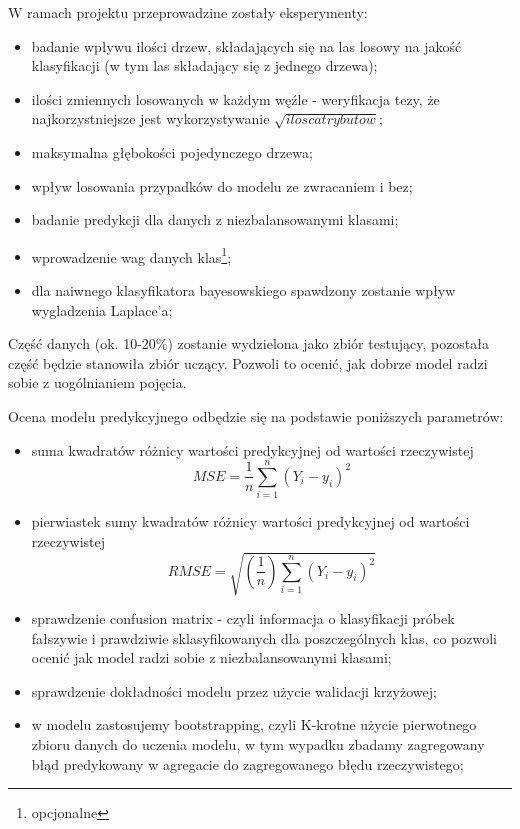 
W ramach projektu przeprowadzine zostały eksperymenty:
\begin{itemize}
    \item badanie wpływu ilości drzew, składających się na las losowy na jakość klasyfikacji (w tym las składający się z jednego drzewa);
    \item ilości zmiennych losowanych w każdym węźle - weryfikacja tezy, że najkorzystniejsze jest wykorzystywanie $\sqrt {ilosc atrybutow}$;
    \item maksymalna głębokości pojedynczego drzewa;
    \item wpływ losowania przypadków do modelu ze zwracaniem i bez;
    \item badanie predykcji dla danych z niezbalansowanymi klasami;
        \item wprowadzenie wag danych klas\footnote[2]{opcjonalne};
        \item dla naiwnego klasyfikatora bayesowskiego spawdzony zostanie wpływ wygladzenia Laplace'a;
        
\end{itemize}

Część danych (ok. 10-20\%) zostanie wydzielona jako zbiór testujący, pozostała część będzie stanowiła zbiór uczący. Pozwoli to ocenić, jak dobrze model radzi sobie z uogólnianiem pojęcia. 

Ocena modelu predykcyjnego odbędzie się na podstawie poniższych parametrów:
\begin{itemize}
    \item suma kwadratów różnicy wartości predykcyjnej od wartości rzeczywistej
    \begin{equation}
    MSE = {\frac{1}{n}\sum_{i=1}^{n}(Y_{i} - y_{i})^{2}}
    \end{equation}
    \item pierwiastek sumy kwadratów różnicy wartości predykcyjnej od wartości rzeczywistej
    \begin{equation}
    RMSE = \sqrt{(\frac{1}{n})\sum_{i=1}^{n}(Y_{i} - y_{i})^{2}}
    \end{equation}
    \item sprawdzenie confusion matrix - czyli informacja o klasyfikacji próbek fałszywie i prawdziwie sklasyfikowanych dla poszczególnych klas, co pozwoli ocenić jak model radzi sobie z niezbalansowanymi klasami;
    \item sprawdzenie dokładności modelu przez użycie walidacji krzyżowej;
    \item w modelu zastosujemy bootstrapping, czyli K-krotne użycie pierwotnego zbioru danych do uczenia modelu, w tym wypadku zbadamy zagregowany błąd predykowany w agregacie do zagregowanego błędu rzeczywistego;
\end{itemize}

